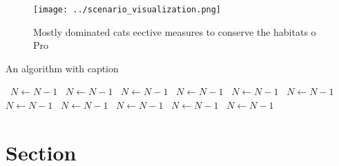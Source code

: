 \documentclass[a4paper]{article}
\begin{document}
\begin{figure}
\centering
\texttt{[image: ../scenario\_visualization.png]}
\caption{Mostly dominated cats eective measures to conserve the habitats o Pro
}
\end{figure}
 
\begin{algorithm}
\caption{An algorithm with caption}
\begin{algorithmic}
\    \State $N \gets N - 1$
\    \State $N \gets N - 1$
\    \State $N \gets N - 1$
\    \State $N \gets N - 1$
\    \State $N \gets N - 1$
\    \State $N \gets N - 1$
\    \State $N \gets N - 1$
\    \State $N \gets N - 1$
\    \State $N \gets N - 1$
\    \State $N \gets N - 1$
\    \State $N \gets N - 1$
\EndWhile
\end{algorithmic}
\end{algorithm}

\section{Section}
\end{document}
